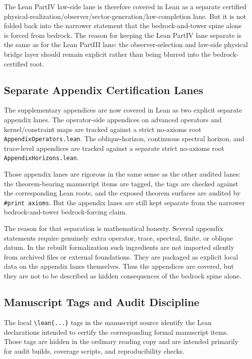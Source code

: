 The Lean PartIV law-side lane is therefore covered in Lean as a separate
certified physical-realization/observer/sector-generation/law-completion lane.
But it is not folded back into the narrower statement that the
bedrock-and-tower spine alone is forced from bedrock. The reason for keeping
the Lean PartIV lane separate is the same as for the Lean PartIII lane: the
observer-selection and law-side physical bridge layer should remain explicit rather than being
blurred into the
bedrock-certified root.

\subsection{Separate Appendix Certification Lanes}
\label{subsec:formal-appendix-status}

The supplementary appendices are now covered in Lean as two explicit separate
appendix lanes. The operator-side appendices on advanced operators and
kernel/constraint maps are tracked against a strict no-axioms root
\texttt{AppendixOperators.lean}. The oblique-horizon, continuous spectral
horizon, and trace-level appendices are tracked against a separate strict
no-axioms root \texttt{AppendixHorizons.lean}.

Those appendix lanes are rigorous in the same sense as the other audited
lanes: the theorem-bearing manuscript items are tagged, the tags are checked
against the corresponding Lean roots, and the exposed theorem surfaces are
audited by \verb|#print axioms|. But the appendix lanes are still kept
separate from the narrower bedrock-and-tower bedrock-forcing claim.

The reason for that separation is mathematical honesty. Several appendix
statements require genuinely extra operator, trace, spectral, finite, or
oblique datum. In the rebuilt formalization such ingredients are not imported
silently from archived files or external foundations. They are packaged as
explicit local data on the appendix lanes themselves. Thus the appendices are
covered, but they are not to be described as hidden consequences of the
bedrock spine alone.

\subsection{Manuscript Tags and Audit Discipline}
\label{subsec:formal-tags}

The local \verb|\lean{...}| tags in the manuscript source identify the Lean
declarations intended to certify the corresponding formal manuscript items.
Those tags are hidden in the ordinary reading copy and are intended primarily
for audit builds, coverage scripts, and reproducibility checks.

